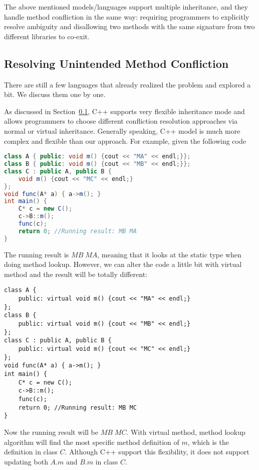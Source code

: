 The above mentioned models/languages support multiple inheritance, and they handle method confliction in the same way: requiring 
programmers to explicitly resolve ambiguity and disallowing two methods with the same signature from two different libraries 
to co-exit.

\subsection{Resolving Unintended Method Confliction}
There are still a few languages that already realized the problem and explored a bit. We discuss them one by one.

As discussed in Section~\ref{}, C++ supports very flexible inheritance mode and allows programmers to choose different 
confliction resolution approaches via normal or virtual inheritance. Generally speaking, C++ model is much more complex 
and flexible than our approach. For example, given the following code
\begin{lstlisting}[language=Java]
class A { public: void m() {cout << "MA" << endl;}};
class B { public: void m() {cout << "MB" << endl;}};
class C : public A, public B { 
	void m() {cout << "MC" << endl;}
};
void func(A* a) { a->m(); }
int main() {
	C* c = new C();
	c->B::m();
	func(c); 
	return 0; //Running result: MB MA
}
\end{lstlisting}
The running result is $MB \; MA$, meaning that it looks at the static type when doing method lookup. However, we can alter the code 
a little bit with virtual method and the result will be totally different:
\begin{lstlisting}
class A { 
	public: virtual void m() {cout << "MA" << endl;}
};
class B { 
	public: virtual void m() {cout << "MB" << endl;}
};
class C : public A, public B { 
    public: virtual void m() {cout << "MC" << endl;}
};
void func(A* a) { a->m(); }
int main() {
	C* c = new C();
	c->B::m();
	func(c); 
	return 0; //Running result: MB MC
}
\end{lstlisting}
Now the running result will be $MB \; MC$. With virtual method, method lookup algorithm will find the most specific 
method definition of $m$, which is the definition in class $C$. Although C++ support this flexibility, it does not 
support updating both $A.m$ and $B.m$ in class $C$. 

\begin{lstlisting}
\end{lstlisting}


